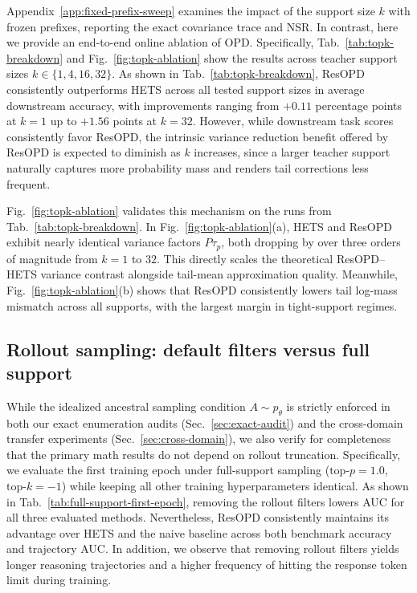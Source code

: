 Appendix~\ref{app:fixed-prefix-sweep} examines the impact of the support size $k$ with frozen prefixes, reporting the exact covariance trace and NSR. In contrast, here we provide an end-to-end online ablation of OPD. Specifically, Tab.~\ref{tab:topk-breakdown} and Fig.~\ref{fig:topk-ablation} show the results across teacher support sizes $k \in \{1, 4, 16, 32\}$.
As shown in Tab.~\ref{tab:topk-breakdown}, ResOPD consistently outperforms HETS across all tested support sizes in average downstream accuracy, with improvements ranging from $+0.11$ percentage points at $k=1$ up to $+1.56$ points at $k=32$.
However, while downstream task scores consistently favor ResOPD, the intrinsic variance reduction benefit offered by ResOPD is expected to diminish as $k$ increases, since a larger teacher support naturally captures more probability mass and renders tail corrections less frequent.

Fig.~\ref{fig:topk-ablation} validates this mechanism on the runs from Tab.~\ref{tab:topk-breakdown}.
In Fig.~\ref{fig:topk-ablation}(a), HETS and ResOPD exhibit nearly identical variance factors $P\tau_p$,  both dropping by over three orders of magnitude from $k=1$ to $32$. This directly scales the theoretical
ResOPD--HETS variance contrast alongside tail-mean approximation quality.
Meanwhile, Fig.~\ref{fig:topk-ablation}(b) shows that ResOPD consistently lowers tail log-mass mismatch across all supports,
with the largest margin in tight-support regimes.

\subsection{Rollout sampling: default filters versus full support}
\label{sec:rollout-ablation}
While the idealized ancestral sampling condition $A\sim p_\theta$ is strictly enforced in both our exact enumeration audits (Sec.~\ref{sec:exact-audit}) and the cross-domain transfer experiments (Sec.~\ref{sec:cross-domain}), we also verify for completeness that the primary math results do not depend on rollout truncation. Specifically, we evaluate the first training epoch under full-support sampling ($\text{top-}p=1.0$, $\text{top-}k=-1$) while keeping all other training hyperparameters identical.
As shown in Tab.~\ref{tab:full-support-first-epoch}, removing the rollout filters lowers AUC for all three evaluated methods. Nevertheless, ResOPD consistently maintains its advantage over HETS and the naive baseline across both benchmark accuracy and trajectory AUC. In addition, we observe that removing rollout filters yields longer reasoning trajectories and a higher frequency of hitting the response token limit during training.

